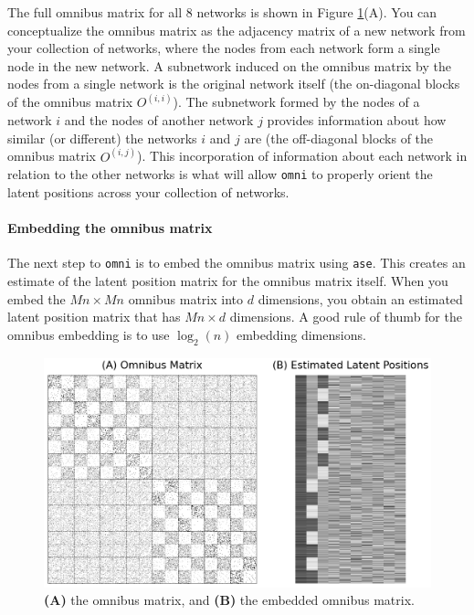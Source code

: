 The full omnibus matrix for all $8$ networks is shown in Figure \ref{fig:ch6:multinet:omni:fullmtx}(A). You can conceptualize the omnibus matrix as the adjacency matrix of a new network from your collection of networks, where the nodes from each network form a single node in the new network. A subnetwork induced on the omnibus matrix by the nodes from a single network is the original network itself (the on-diagonal blocks of the omnibus matrix $O^{(i,i)}$). The subnetwork formed by the nodes of a network $i$ and the nodes of another network $j$ provides information about how similar (or different) the networks $i$ and $j$ are (the off-diagonal blocks of the omnibus matrix $O^{(i, j)}$). This incorporation of information about each network in relation to the other networks is what will allow \texttt{omni} to properly orient the latent positions across your collection of networks.

\paragraph*{Embedding the omnibus matrix}

The next step to \texttt{omni} is to embed the omnibus matrix using \texttt{ase}. This creates an estimate of the latent position matrix for the omnibus matrix itself. When you embed the $Mn \times Mn$ omnibus matrix into $d$ dimensions, you obtain an estimated latent position matrix that has $Mn \times d$ dimensions. A good rule of thumb for the omnibus embedding is to use $\log_2(n)$ embedding dimensions.

\begin{figure}[h]
    \centering
    \includegraphics[width=\linewidth]{representations/ch6/Images/omni_mtx.png}
    \caption[omnibus matrix and omnibus embedding]{\textbf{(A)} the omnibus matrix, and \textbf{(B)} the embedded omnibus matrix.}
    \label{fig:ch6:multinet:omni:fullmtx}
\end{figure}

